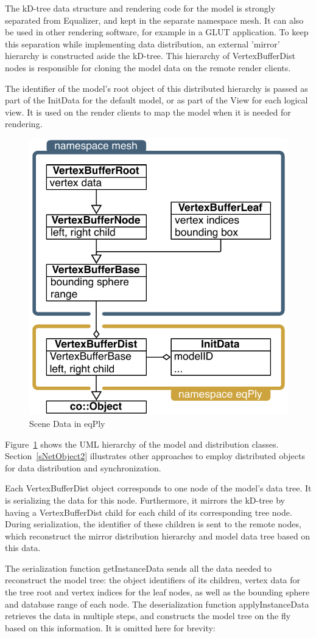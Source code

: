 \documentclass[10pt,a4]{scrartcl}
\newcommand{\fig}[1]{Figure~\ref{#1}}
\newcommand{\sref}[1]{Section~\ref{#1}}
\begin{document}
The kD-tree data structure and rendering code for the model is strongly
separated from Equalizer, and kept in the separate namespace \textsf{mesh}. It
can also be used in other rendering software, for example in a GLUT
application. To keep this separation while implementing data distribution, an
external 'mirror' hierarchy is constructed aside the kD-tree. This hierarchy of
\textsf{VertexBufferDist} nodes is responsible for cloning the model data on the
remote render clients.

The identifier of the model's root object of this distributed hierarchy
is passed as part of the \textsf{InitData} for the default model, or as
part of the \textsf{View} for each logical view. It is used on the
render clients to map the model when it is needed for
rendering. 

\begin{figure}
  \includegraphics[width=.382\textwidth]{images/modelDist.pdf}
  {\caption{\label{fModelDist}Scene Data in eqPly}}
\end{figure}
\fig{fModelDist} shows the UML hierarchy of the model and distribution
classes. \sref{sNetObject2} illustrates other approaches to employ distributed
objects for data distribution and synchronization.

Each \textsf{VertexBufferDist} object corresponds to one node of the
model's data tree. It is serializing the data for this
node. Furthermore, it mirrors the kD-tree by having a
\textsf{VertexBufferDist} child for each child of its corresponding tree
node. During serialization, the identifier of these children is sent to
the remote nodes, which reconstruct the mirror distribution hierarchy
and model data tree based on this data.

The serialization function \textsf{getInstanceData} sends all the data
needed to reconstruct the model tree: the object identifiers of its
children, vertex data for the tree root and vertex indices for the leaf
nodes, as well as the bounding sphere and database range of each
node. The deserialization function \textsf{applyInstanceData} retrieves
the data in multiple steps, and constructs the model tree on the fly
based on this information. It is omitted here for brevity:
\end{document}
